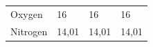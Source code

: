 {\begin{tabular}[t]{|l|l|l|l|}
    
        Oxygen &
    
    
        16 &
    
    
        16 &
    
    
        16%
     \tabularnewline\cline{1-1}\cline{2-2}\cline{3-3}\cline{4-4}
    
    
        Nitrogen &
    
    
        14,01 &
    
    
        14,01 &
    
    
        14,01%
     \tabularnewline\cline{1-1}\cline{2-2}\cline{3-3}\cline{4-4}
    

\end{tabular}}
